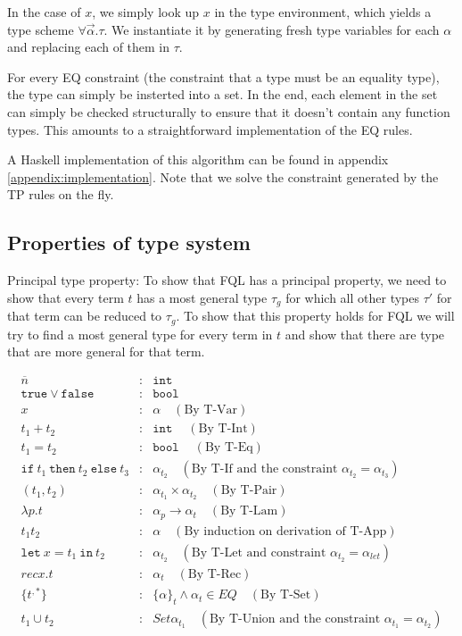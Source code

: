 \documentclass[a4paper]{article}
\newcommand{\s}[1]{\mathtt{#1}}
\newcommand{\sn}{\overline{n}}
\newcommand{\sLb}{\s{\{}}
\newcommand{\sRb}{\s{\}}}
\newcommand{\sbool}{\s{bool\ }}
\newcommand{\sint}{\s{int\ }}
\newcommand{\sif}{\s{if\ }}
\newcommand{\sthen}{\s{\ then\ }}
\newcommand{\selse}{\s{\ else\ }}
\newcommand{\sletin}[2]{\s{let\ } #1 \s{\ in\ } #2}
\newcommand{\strue}{\s{true}}
\newcommand{\sfalse}{\s{false}}
\newcommand{\sset}[1]{\sLb #1 \sRb}
\begin{document}
In the case of $x$, we simply look up $x$ in the type environment,
which yields a type scheme $\forall \vec{\alpha}.\tau$. We
instantiate it by generating fresh type variables for each $\alpha$
and replacing each of them in $\tau$.

For every EQ constraint (the constraint that a type must be an
equality type), the type can simply be insterted into a set.
In the end, each element in the set can simply be checked
structurally to ensure that it doesn't contain any function types.
This amounts to a straightforward implementation of the EQ rules.

A Haskell implementation of this algorithm can be found in appendix
\ref{appendix:implementation}. Note that we solve the constraint
generated by the TP rules on the fly.

\subsection{Properties of type system}
\label{syntacticProperties}

Principal type property:
To show that FQL has a principal property, we need to show that every term $t$ has a most general type $\tau_g$ for which all other types $\tau'$ for that term can be reduced to $\tau_g$. To show that this property holds for FQL we will try to find a most general type for every term in $t$ and show that there are type that are more general for that term.

\begin{eqnarray*}
\sn &:& \sint\\
\strue \vee \sfalse &:& \sbool\\
x &:& \alpha \quad(\text{By T-Var})\\
t_1 + t_2 &:& \sint \quad(\text{By T-Int})\\
t_1 = t_2 &:& \sbool \quad(\text{By T-Eq})\\
\sif t_1 \sthen t_2 \selse t_3 &:& \alpha_{t_2} \quad(\text{By T-If and the constraint } \alpha_{t_2} = \alpha_{t_3})\\
(t_1, t_2) &:& \alpha_{t_1} \times \alpha_{t_2} \quad(\text{By T-Pair})\\
\lambda p.t &:& \alpha_p \to \alpha_t \quad(\text{By T-Lam})\\
t_1t_2 &:& \alpha \quad(\text{By induction on derivation of T-App})\\
\sletin{x=t_1}{t_2} &:& \alpha_{t_2} \quad(\text{By T-Let and constraint }\alpha_{t_2} = \alpha_{let})\\
rec x.t &:& \alpha_t \quad(\text{By T-Rec})\\
\sLb t^{,*} \sRb &:& \sset \alpha_t \wedge \alpha_t \in EQ \quad(\text{By T-Set})\\
t_1 \cup t_2 &:& Set \alpha_{t_1} \quad(\text{By T-Union and the constraint }\alpha_{t_1} = \alpha_{t_2})
\end{eqnarray*}
\end{document}
